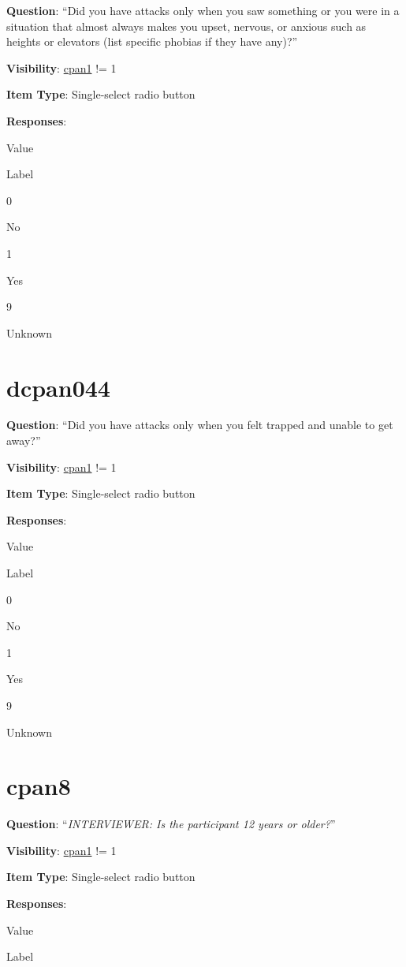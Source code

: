 \documentclass[]{book}
\begin{document}
\textbf{Question}: ``Did you have attacks only when you saw something or you were in a situation that almost always makes you upset, nervous, or anxious such as heights or elevators (list specific phobias if they have any)?''

\textbf{Visibility}: \protect\hyperlink{cpan1}{cpan1} != 1

\textbf{Item Type}: Single-select radio button

\textbf{Responses}:

Value

Label

0

No

1

Yes

9

Unknown

\hypertarget{dcpan044}{%
\section{dcpan044}\label{dcpan044}}

\textbf{Question}: ``Did you have attacks only when you felt trapped and unable to get away?''

\textbf{Visibility}: \protect\hyperlink{cpan1}{cpan1} != 1

\textbf{Item Type}: Single-select radio button

\textbf{Responses}:

Value

Label

0

No

1

Yes

9

Unknown

\hypertarget{cpan8}{%
\section{cpan8}\label{cpan8}}

\textbf{Question}: ``\emph{INTERVIEWER: Is the participant 12 years or older?}''

\textbf{Visibility}: \protect\hyperlink{cpan1}{cpan1} != 1

\textbf{Item Type}: Single-select radio button

\textbf{Responses}:

Value

Label
\end{document}
